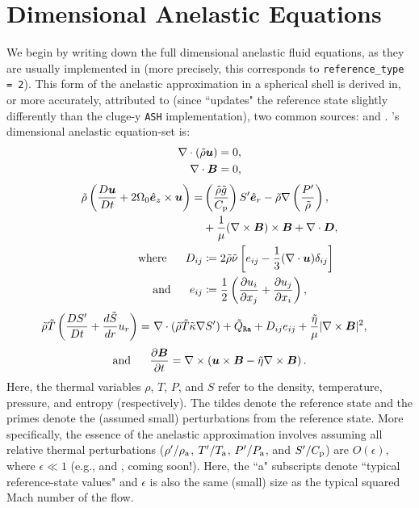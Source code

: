 \documentclass[12pt]{article}
\numberwithin{equation}{section}
\newcommand{\tmpa}{T_{\rm a}}
\newcommand{\rhoa}{\rho_{\rm a}}
\newcommand{\prsa}{P_{\rm a}}
\begin{document}
	\section{Dimensional Anelastic Equations}\label{sec:eqdim}
	We begin by writing down the full dimensional anelastic fluid equations, as they are usually implemented in {\rayleigh} (more precisely, this corresponds to \texttt{reference\_type = 2}). This form of the anelastic approximation in a spherical shell is derived in, or more accurately, attributed to (since {\rayleigh} ``updates" the reference state slightly differently than the cluge-y \texttt{ASH} implementation), two common sources: \citet{Gilman1981} and \citet{Clune1999}. {\rayleigh}'s dimensional anelastic equation-set is:
	\begin{align}
		\nabla\cdot(\tilde{\rho}\bm{u}) &= 0\label{eq:contdim},\\
		\nabla\cdot \bm{B} &= 0,
	\end{align}
	\begin{subequations}\label{eq:momdim}
	\begin{align}
		\tilde{\rho}\left(\frac{D\bm{u}}{Dt}+2\Omega_0\hat{\bm{e}}_z\times\bm{u}\right) = &  \left(\frac{\tilde{\rho} \tilde{g}}{C_{\rm{p}}}\right) {S^\prime}\hat{\bm{e}}_r-\tilde{\rho}\nabla\left( \frac{{P^\prime}}{\tilde{\rho}} \right), \nonumber\\
		&+ \frac{1}{\mu}(\nabla\times\bm{B})\times\bm{B}+\nabla\cdot\bm{D},\\
		\text{where}\ \ \ \ \  D_{ij} &\coloneqq 2\tilde{\rho}\tilde{\nu} \left[e_{ij} - \frac{1}{3}(\nabla\cdot\bm{u}) \delta_{ij} \right]\label{eq:dstressdim}\\
		\text{and}\ \ \ \ \  e_{ij} &\coloneqq \frac{1}{2}\left(\frac{\partial u_i}{\partial x_j} + \frac{\partial u_j}{\partial x_i} \right),\label{eq:estressdim}
	\end{align}
	\end{subequations}
	\begin{align}\label{eq:endim}
		\tilde{\rho}\tilde{T} \left(\frac{D{S^\prime}}{Dt} + \frac{d\tilde{S}}{dr} u_r\right) = &\ \nabla\cdot(\tilde{\rho} \tilde{T} \tilde{\kappa} \nabla {S^\prime}) +\tilde{Q}_{\texttt{Ra}}+ D_{ij}e_{ij} + \frac{\tilde{\eta}}{\mu}|\nabla\times\bm{B}|^2,
	\end{align}
	\begin{align}\label{eq:inddim}
	\text{and}\ \ \ \ \  \frac{\partial\bm{B}}{\partial t} = \nabla\times\left(\bm{u}\times\bm{B} - \tilde{\eta}\nabla\times\bm{B}\right).
	\end{align}
	Here, the thermal variables $\rho$, $T$, $P$, and $S$ refer to the density, temperature, pressure, and entropy (respectively). The tildes denote the reference state and the primes denote the (assumed small) perturbations from the reference state. More specifically, the essence of the anelastic approximation involves assuming all relative thermal perturbations ($\rhoprime/\rhoa$, $\tmpprime/\tmpa$, $\prsprime/\prsa$, and ${S^\prime}/C_{\rm{p}}$) are $O(\epsilon)$, where $\epsilon\ll1$ (e.g., \citealt{Ogura1962,Gough1969} and \citealt{Matilsky2024b}, coming soon!). Here, the ``a" subscripts denote ``typical reference-state values" and $\epsilon$ is also the same (small) size as the typical squared Mach number of the flow. 
	
\end{document}
